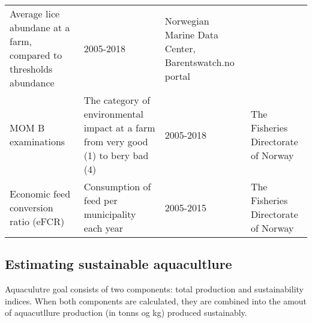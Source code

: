 \documentclass[
]{book}
\begin{document}
\begin{longtable}[]{@{}llll@{}}
\begin{minipage}[t]{0.22\columnwidth}
Average lice abundane at a farm, compared to thresholds abundance\strut
\end{minipage} & \begin{minipage}[t]{0.25\columnwidth}\raggedright
2005-2018\strut
\end{minipage} & \begin{minipage}[t]{0.18\columnwidth}\raggedright
Norwegian Marine Data Center, Barentswatch.no portal\strut
\end{minipage}\tabularnewline
\begin{minipage}[t]{0.23\columnwidth}\raggedright
MOM B examinations\strut
\end{minipage} & \begin{minipage}[t]{0.22\columnwidth}\raggedright
The category of environmental impact at a farm from very good (1) to bery bad (4)\strut
\end{minipage} & \begin{minipage}[t]{0.25\columnwidth}\raggedright
2005-2018\strut
\end{minipage} & \begin{minipage}[t]{0.18\columnwidth}\raggedright
The Fisheries Directorate of Norway\strut
\end{minipage}\tabularnewline
\begin{minipage}[t]{0.23\columnwidth}\raggedright
Economic feed conversion ratio (eFCR)\strut
\end{minipage} & \begin{minipage}[t]{0.22\columnwidth}\raggedright
Consumption of feed per municipality each year\strut
\end{minipage} & \begin{minipage}[t]{0.25\columnwidth}\raggedright
2005-2015\strut
\end{minipage} & \begin{minipage}[t]{0.18\columnwidth}\raggedright
The Fisheries Directorate of Norway\strut
\end{minipage}\tabularnewline
\bottomrule
\end{longtable}

\hypertarget{estimating-sustainable-aquacultlure}{%
\subsection{Estimating sustainable aquacultlure}\label{estimating-sustainable-aquacultlure}}

Aquaculutre goal consists of two components: total production and sustainability indices. When both components are calculated, they are combined into the amout of aquacutllure production (in tonns og kg) produced sustainably.
\end{document}
